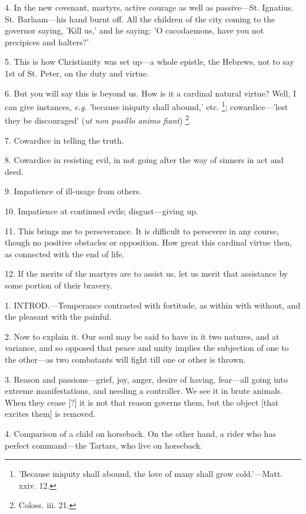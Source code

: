 4. In the new covenant, martyrs, active courage
as well as passive—St. Ignatius. St. Barlaam—his hand burnt off.
All the children of the city coming to the governor saying, 'Kill us,'
and he saying: 'O cacodaemons, have you not precipices and halters?'

5. This is how Christianity was set up—a whole
epistle, the Hebrews, not to say 1st of St. Peter, on the duty and
virtue.

6. But you will say this is beyond us. How is it
a cardinal natural virtue? Well, I can give instances, \emph{e.g}.
'because iniquity shall abound,' etc. \footnote{'Because iniquity shall
abound, the love of many shall grow cold.'—Matt. xxiv. 12.}; cowardice—'lest they be discouraged' (\emph{ut non pusillo
animo fiant}) \footnote{Coloss. iii. 21.}.

7. Cowardice in telling the truth.

8. Cowardice in resisting evil, in not going
after the way of sinners in act and deed.

9. Impatience of ill-usage from others.

10. Impatience at continued evils;
disgust—giving up.

11. This brings me to perseverance. It is
difficult to persevere in any course, though no positive obstacles or
opposition. How great this cardinal virtue then, as connected with the
end of life.

12. If the merits of the martyrs are to assist
us, let us merit that assistance by some portion of their bravery.


1. INTROD.—Temperance
contrasted with fortitude, as within with without, and the pleasant
with the painful.

2. Now to explain it. Our soul may be said to
have in it two natures, and at variance, and so opposed that peace and
unity implies the subjection of one to the other—as two combatants
will fight till one or other is thrown.

3. Reason and passions—grief, joy, anger,
desire of having, fear—all going into extreme manifestations, and
needing a controller. We see it in brute animals. When they cease [?]
it is not that reason governs them, but the object [that excites them]
is removed.

4. Comparison of a child on horseback. On the
other hand, a rider who has perfect command—the Tartars, who live on
horseback.

